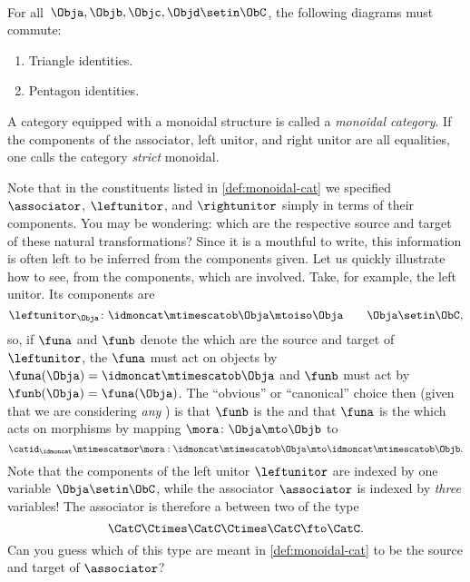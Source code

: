 \begin{ctdefinition}
    \condit\\
    For all~$\Obja,\Objb,\Objc,\Objd\setin \ObC$, the following diagrams must commute:
    \begin{enumerate}
        \item Triangle identities.
        \item Pentagon identities.
    \end{enumerate}
    A category equipped with a monoidal structure is called a \emph{monoidal category}.
    If the components of the associator, left unitor, and right unitor are all equalities, one calls the category \emph{strict} monoidal.
\end{ctdefinition}

\begin{remark}
    Note that in the constituents listed in \cref{def:monoidal-cat} we specified  $\associator$, $\leftunitor$, and $\rightunitor$ simply in terms of their components.
    You may be wondering: which  are the respective source and target of these natural transformations?
    Since it is a mouthful to write, this information is often left to be inferred from the components given.
    Let us quickly illustrate how to see, from the components, which  are involved.
    Take, for example, the left unitor.
    Its components are
    \begin{equation}
        \leftunitor_\Obja \colon \idmoncat\mtimescatob \Obja \mtoiso \Obja \quad \quad \Obja\setin \ObC,
    \end{equation}
    so, if $\funa$ and $\funb$ denote the  which are the source and target of $\leftunitor$, the  $\funa$ must act on objects by $\funa(\Obja) = \idmoncat \mtimescatob \Obja$ and $\funb$ must act by $\funb(\Obja) = \funa(\Obja)$.
    The ``obvious'' or ``canonical'' choice then (given that we are considering \emph{any} ) is that $\funb$ is the  and that $\funa$ is the  which acts on morphisms by mapping $\mora \colon \Obja \mto \Objb$ to
    \begin{equation}
        \catid_\idmoncat \mtimescatmor \mora:   \idmoncat\mtimescatob \Obja \mto  \idmoncat\mtimescatob \Objb.
    \end{equation}
    Note that the components of the left unitor $\leftunitor$ are indexed by one variable $\Obja \setin \ObC$, while the associator $\associator$ is indexed by \emph{three} variables!
    The associator is therefore a  between two  of the type
    \begin{equation}
        \CatC \Ctimes \CatC \Ctimes \CatC \fto \CatC.
    \end{equation}
    Can you guess which  of this type are meant in \cref{def:monoidal-cat} to be the source and target of $\associator$?
\end{remark}

